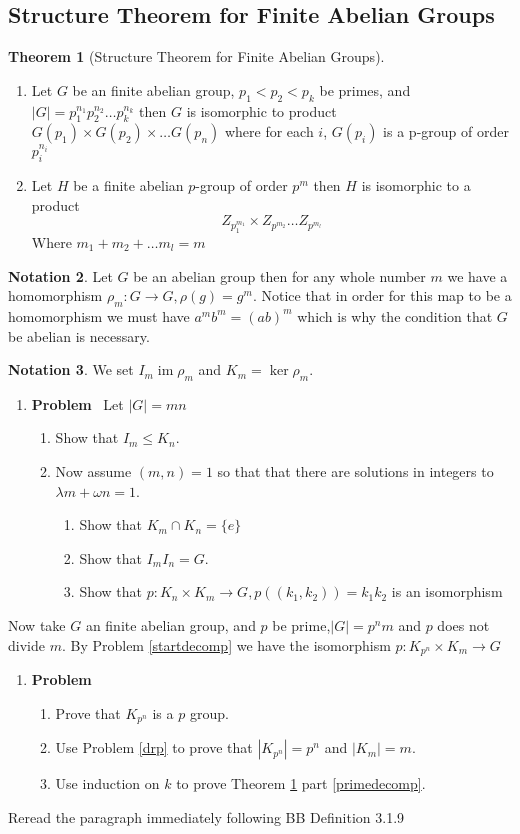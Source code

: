 \documentclass[12pt]{amsart}
\newcommand{\benu}{\begin{enumerate}}
\newcommand{\eenu}{\end{enumerate}}
\theoremstyle{definition}
\newtheorem{theorem}{Theorem}
\newtheorem{notation}[theorem]{Notation}
\newcommand{\bnot}{\begin{notation}}
\newcommand{\enot}{\end{notation}}
\newcommand{\bet}{\begin{theorem}}
\newcommand{\et}{\end{theorem}}
\DeclareMathOperator{\im}{im}
\newcommand{\itep}{\item {\bfseries Problem}\ }
\begin{document}
\subsection{Structure Theorem for Finite Abelian Groups}
\bet[Structure Theorem for  Finite Abelian Groups] \label{structabelian} \hfill
\benu
\item \label{primedecomp} Let $G$ be an finite abelian group, $p_1<p_2<p_k$ be primes, and $|G|=p_1^{n_1}p_2^{n_2}\dots p_k^{n_k}$ then $G$ is isomorphic to product $G(p_1)\times G(p_2)\times \dots G(p_n)$ where for each $i$, $G(p_i)$ is a p-group of order $p_i^{n_i}$
\item \label{pt2} Let $H$ be a finite abelian $p$-group of order $p^m$ then $H$ is isomorphic to a product 
\[ Z_{p_1^{m_1}}\times Z_{p^{m_2}}\dots Z_{p^{m_l}}\]
Where $m_1+m_2+\dots m_l=m$
\eenu
\et


\bnot Let $G$ be an abelian group then for any whole number $m$ we have a homomorphism $\rho_m \colon G\to G,\rho(g)=g^m$. Notice that in order for this map to be a homomorphism we must have $a^mb^m=(ab)^m$ which is why the condition that $G$ be abelian is necessary.
\enot


\bnot  We set $I_m\im{\rho_m}$ and $K_m=\ker{\rho_m}$.
\enot
\begin{enumerate}[resume=p]
\itep \label{startdecomp} Let $|G|=mn$ 
\benu
\item
 Show that $I_m\leq K_n$. 
 
\item Now assume $(m,n)=1$ so that  that there are solutions in integers to $\lambda m+\omega n=1$.
\benu
\item Show that $K_m\cap K_n=\{e\}$
\item Show that $I_mI_n=G$.
\item Show that $p:K_n\times K_m\to G, p((k_1,k_2))= k_1k_2$ is an isomorphism
\eenu
\eenu

\end{enumerate}

Now take $G$ an finite abelian group, and $p$ be prime,$|G|=p^nm$ and $p$ does not divide $m$. By Problem \ref{startdecomp} we have the isomorphism $p:K_{p^n}\times K_m\to G$
\begin{enumerate}[resume=p]
\itep
\benu
\item Prove that $K_{p^n}$ is a $p$ group.
\item Use Problem \ref{drp} to prove that $|K_{p^n}|=p^n$ and $|K_m|=m$.
\item Use induction on $k$ to prove Theorem \ref{structabelian} part \ref{primedecomp}. 
\eenu
\end{enumerate}
Reread the paragraph immediately following BB Definition 3.1.9
\end{document}
